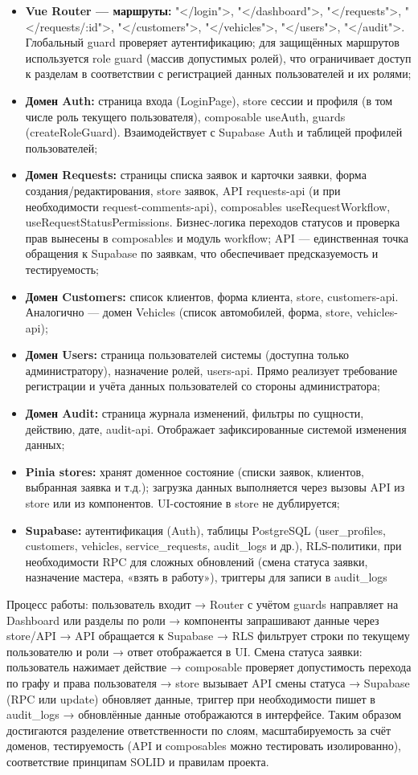 \begin{itemize}
	\item \textbf{Vue Router — маршруты:} "</login">, "</dashboard">, "</requests">, "</requests/:id">, "</customers">, "</vehicles">, "</users">, "</audit">. Глобальный guard проверяет аутентификацию; для защищённых маршрутов используется role guard (массив допустимых ролей), что ограничивает доступ к разделам в соответствии с регистрацией данных пользователей и их ролями;
	\item \textbf{Домен Auth:} страница входа (LoginPage), store сессии и профиля (в том числе роль текущего пользователя), composable useAuth, guards (createRoleGuard). Взаимодействует с Supabase Auth и таблицей профилей пользователей;
	\item \textbf{Домен Requests:} страницы списка заявок и карточки заявки, форма создания/редактирования, store заявок, API requests-api (и при необходимости request-comments-api), composables useRequestWorkflow, useRequestStatusPermissions. Бизнес-логика переходов статусов и проверка прав вынесены в composables и модуль workflow; API — единственная точка обращения к Supabase по заявкам, что обеспечивает предсказуемость и тестируемость;
	\item \textbf{Домен Customers:} список клиентов, форма клиента, store, customers-api. Аналогично — домен Vehicles (список автомобилей, форма, store, vehicles-api);
	\item \textbf{Домен Users:} страница пользователей системы (доступна только администратору), назначение ролей, users-api. Прямо реализует требование регистрации и учёта данных пользователей со стороны администратора;
	\item \textbf{Домен Audit:} страница журнала изменений, фильтры по сущности, действию, дате, audit-api. Отображает зафиксированные системой изменения данных;
	\item \textbf{Pinia stores:} хранят доменное состояние (списки заявок, клиентов, выбранная заявка и т.д.); загрузка данных выполняется через вызовы API из store или из компонентов. UI-состояние в store не дублируется;
	\item \textbf{Supabase:} аутентификация (Auth), таблицы PostgreSQL (user\_profiles, customers, vehicles, service\_requests, audit\_logs и др.), RLS-политики, при необходимости RPC для сложных обновлений (смена статуса заявки, назначение мастера, «взять в работу»), триггеры для записи в audit\_logs
\end{itemize}

Процесс работы: пользователь входит → Router с учётом guards направляет на Dashboard или разделы по роли → компоненты запрашивают данные через store/API → API обращается к Supabase → RLS фильтрует строки по текущему пользователю и роли → ответ отображается в UI. Смена статуса заявки: пользователь нажимает действие → composable проверяет допустимость перехода по графу и права пользователя → store вызывает API смены статуса → Supabase (RPC или update) обновляет данные, триггер при необходимости пишет в audit\_logs → обновлённые данные отображаются в интерфейсе. Таким образом достигаются разделение ответственности по слоям, масштабируемость за счёт доменов, тестируемость (API и composables можно тестировать изолированно), соответствие принципам SOLID и правилам проекта.

